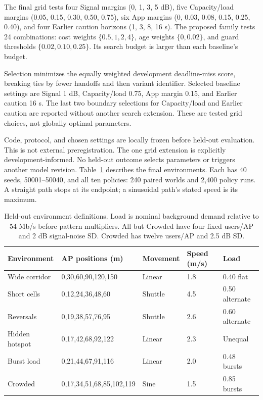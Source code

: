 \documentclass[11pt,a4paper]{article}
\begin{document}
The final grid tests four Signal margins (0, 1, 3, 5 dB), five Capacity/load margins (0.05, 0.15, 0.30, 0.50, 0.75), six App margins (0, 0.03, 0.08, 0.15, 0.25, 0.40), and four Earlier caution horizons (1, 3, 8, 16 s). The proposed family tests 24 combinations: cost weights $\{0.5,1,2,4\}$, age weights $\{0,0.02\}$, and guard thresholds $\{0.02,0.10,0.25\}$. Its search budget is larger than each baseline's budget.

Selection minimizes the equally weighted development deadline-miss score, breaking ties by fewer handoffs and then variant identifier. Selected baseline settings are Signal 1 dB, Capacity/load 0.75, App margin 0.15, and Earlier caution 16 s. The last two boundary selections for Capacity/load and Earlier caution are reported without another search extension. These are tested grid choices, not globally optimal parameters.

Code, protocol, and chosen settings are locally frozen before held-out evaluation. This is not external preregistration. The one grid extension is explicitly development-informed. No held-out outcome selects parameters or triggers another model revision. Table~\ref{tab:scenarios} describes the final environments. Each has 40 seeds, 50001--50040, and all ten policies: 240 paired worlds and 2,400 policy runs. A straight path stops at its endpoint; a sinusoidal path's stated speed is its maximum.

\begin{table}[htbp]\centering\small
\caption{Held-out environment definitions. Load is nominal background demand relative to 54 Mb/s before pattern multipliers. All but Crowded have four fixed users/AP and 2 dB signal-noise SD. Crowded has twelve users/AP and 2.5 dB SD.}\label{tab:scenarios}
\begin{tabularx}{\linewidth}{@{}lXlll@{}}\toprule
Environment & AP positions (m) & Movement & Speed (m/s) & Load\\\midrule
Wide corridor & 0,30,60,90,120,150 & Linear & 1.8 & 0.40 flat\\
Short cells & 0,12,24,36,48,60 & Shuttle & 4.5 & 0.50 alternate\\
Reversals & 0,19,38,57,76,95 & Shuttle & 2.6 & 0.60 alternate\\
Hidden hotspot & 0,17,42,68,92,122 & Linear & 2.3 & Unequal\\
Burst load & 0,21,44,67,91,116 & Linear & 2.0 & 0.48 bursts\\
Crowded & 0,17,34,51,68,85,102,119 & Sine & 1.5 & 0.85 bursts\\\bottomrule
\end{tabularx}
\end{table}
\end{document}
